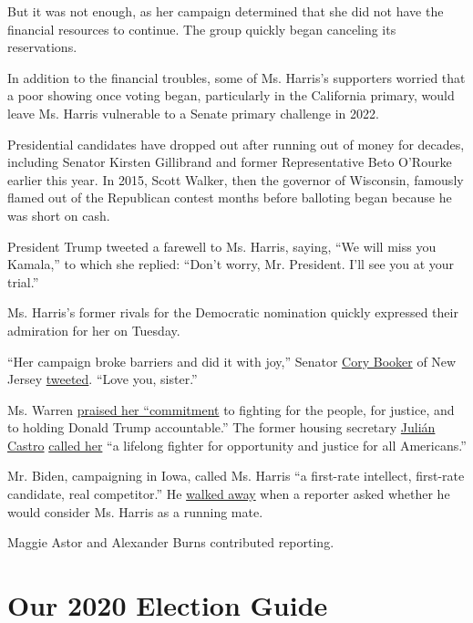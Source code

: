 But it was not enough, as her campaign determined that she did not have
the financial resources to continue. The group quickly began canceling
its reservations.

In addition to the financial troubles, some of Ms. Harris's supporters
worried that a poor showing once voting began, particularly in the
California primary, would leave Ms. Harris vulnerable to a Senate
primary challenge in 2022.

Presidential candidates have dropped out after running out of money for
decades, including Senator Kirsten Gillibrand and former Representative
Beto O'Rourke earlier this year. In 2015, Scott Walker, then the
governor of Wisconsin, famously flamed out of the Republican contest
months before balloting began because he was short on cash.

President Trump tweeted a farewell to Ms. Harris, saying, ``We will miss
you Kamala,'' to which she replied: ``Don't worry, Mr. President. I'll
see you at your trial.''

Ms. Harris's former rivals for the Democratic nomination quickly
expressed their admiration for her on Tuesday.

``Her campaign broke barriers and did it with joy,'' Senator
\href{https://www.nytimes.com/interactive/2020/us/elections/cory-booker.html}{Cory
Booker} of New Jersey
\href{https://twitter.com/CoryBooker/status/1201930335501594624}{tweeted}.
``Love you, sister.''

Ms. Warren
\href{https://twitter.com/ewarren/status/1201939838410379265}{praised
her ``commitment} to fighting for the people, for justice, and to
holding Donald Trump accountable.'' The former housing secretary
\href{https://www.nytimes.com/interactive/2020/us/elections/julian-castro.html}{Julián
Castro}
\href{https://twitter.com/JulianCastro/status/1201932059737903104}{called
her} ``a lifelong fighter for opportunity and justice for all
Americans.''

Mr. Biden, campaigning in Iowa, called Ms. Harris ``a first-rate
intellect, first-rate candidate, real competitor.'' He
\href{https://twitter.com/HowardMortman/status/1201929645073092608}{walked
away} when a reporter asked whether he would consider Ms. Harris as a
running mate.

Maggie Astor and Alexander Burns contributed reporting.

\hypertarget{our-2020-election-guide}{%
\section{Our 2020 Election Guide}\label{our-2020-election-guide}}

